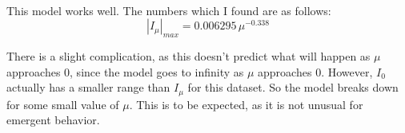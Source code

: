 \documentclass[11pt]{article}
\begin{document}
    \begin{center}
    \end{center}
    { \hspace*{\fill} \\}
    
    This model works well. The numbers which I found are as follows:
\begin{equation}
\left|I_\mu\right|_{max} = 0.006295 \, \mu^{-0.338} 
\end{equation}

There is a slight complication, as this doesn't predict what will happen
as \(\mu\) approaches \(0\), since the model goes to infinity as \(\mu\)
approaches \(0\). However, \(I_0\) actually has a smaller range than
\(I_\mu\) for this dataset. So the model breaks down for some small
value of \(\mu\). This is to be expected, as it is not unusual for
emergent behavior.

    


    
    
    
\end{document}
